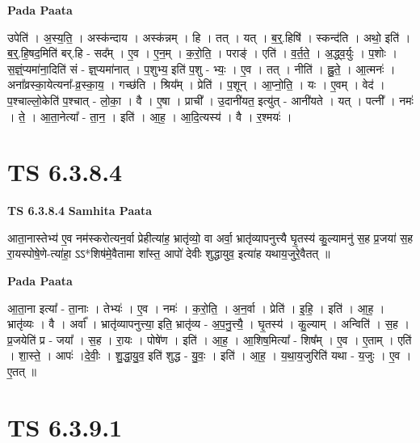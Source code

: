 \documentclass[17pt]{extarticle}
\begin{document}
\textbf{Pada Paata} \newline

उपेति॑ । अ॒स्य॒ति॒ । अस्क॑न्दाय । अस्क॑न्नम् । हि । तत् । यत् । ब॒र्॒.हिषि॑ । स्कन्द॑ति । अथो॒ इति॑ । ब॒र्॒.हि॒षद॒मिति॑ बर्.हि - सद᳚म् । ए॒व । ए॒न॒म् । क॒रो॒ति॒ । पराङ्॑ । एति॑ । व॒र्त॒ते॒ । अ॒द्ध्व॒र्युः । प॒शोः । स॒ज्ञ्ं॒प्यमा॑ना॒दिति॑ सं - ज्ञ्॒प्यमा॑नात् । प॒शुभ्य॒ इति॑ प॒शु - भ्यः॒ । ए॒व । तत् । नीति॑ । ह्नु॒ते॒ । आ॒त्मनः॑ । अना᳚व्रस्का॒येत्यना᳚-व्र॒स्का॒य॒ । गच्छ॑ति । श्रिय᳚म् । प्रेति॑ । प॒शून् । आ॒प्नो॒ति॒ । यः । ए॒वम् । वेद॑ । प॒श्चाल्लो॒केति॑ प॒श्चात् - लो॒का॒ । वै । ए॒षा । प्राची᳚ । उ॒दानी॑यत॒ इत्यु॑त् - आनी॑यते । यत् । पत्नी᳚ । नमः॑ । ते॒ । आ॒ता॒नेत्या᳚ - ता॒न॒ । इति॑ । आ॒ह॒ । आ॒दि॒त्यस्य॑ । वै । र॒श्मयः॑ ।  \newline




\section*{ TS 6.3.8.4 }

\textbf{TS 6.3.8.4 } \newline
\textbf{Samhita Paata} \newline

आता॒नास्तेभ्य॑ ए॒व नम॑स्करोत्यन॒र्वा प्रेहीत्या॑ह॒ भ्रातृ॑व्यो॒ वा अर्वा॒ भ्रातृ॑व्यापनुत्त्यै घृ॒तस्य॑ कु॒ल्यामनु॑ स॒ह प्र॒जया॑ स॒ह रा॒यस्पोषे॒णे-त्या॑हा॒ ऽऽ*शिष॑मे॒वैतामा शा᳚स्त॒ आपो॑ देवीः शुद्धायुव॒ इत्या॑ह यथाय॒जुरे॒वैतत् ॥ \newline

\textbf{Pada Paata} \newline

आ॒ता॒ना इत्या᳚ - ता॒नाः । तेभ्यः॑ । ए॒व । नमः॑ । क॒रो॒ति॒ । अ॒न॒र्वा । प्रेति॑ । इ॒हि॒ । इति॑ । आ॒ह॒ । भ्रातृ॑व्यः । वै । अर्वा᳚ । भ्रातृ॑व्यापनुत्त्या॒ इति॒ भ्रातृ॑व्य - अ॒प॒नु॒त्त्यै॒ । घृ॒तस्य॑ । कु॒ल्याम् । अन्विति॑ । स॒ह । प्र॒जयेति॑ प्र - जया᳚ । स॒ह । रा॒यः । पोषे॑ण । इति॑ । आ॒ह॒ । आ॒शिष॒मित्या᳚ - शिष᳚म् । ए॒व । ए॒ताम् । एति॑ । शा॒स्ते॒ । आपः॑ ।दे॒वीः॒ । शु॒द्धा॒यु॒व॒ इति॑ शुद्ध - यु॒वः॒ । इति॑ । आ॒ह॒ । य॒था॒य॒जुरिति॑ यथा - य॒जुः । ए॒व । ए॒तत् ॥  \newline




\section*{ TS 6.3.9.1 }
\end{document}
